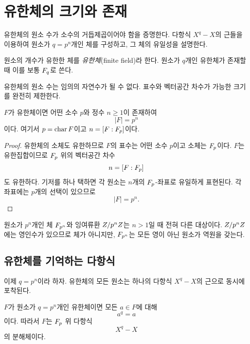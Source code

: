 \section{유한체의 크기와 존재}
\label{sec:finite-field-construction}

\begin{learninggoal}
유한체의 원소 수가 소수의 거듭제곱이어야 함을 증명한다. 다항식 $X^q-X$의 근들을 이용하여 원소가 $q=p^n$개인 체를 구성하고, 그 체의 유일성을 설명한다.
\end{learninggoal}

\begin{definition}[유한체]
원소의 개수가 유한한 체를 \emph{유한체}(finite field)라 한다. 원소가 $q$개인 유한체가 존재할 때 이를 보통 $F_q$로 쓴다.
\end{definition}

유한체의 원소 수는 임의의 자연수가 될 수 없다. 표수와 벡터공간 차수가 가능한 크기를 완전히 제한한다.

\begin{theorem}
$F$가 유한체이면 어떤 소수 $p$와 정수 $n\ge1$이 존재하여
\[
  |F|=p^n
\]
이다. 여기서 $p=\operatorname{char} F$이고 $n=[F:F_p]$이다.
\end{theorem}

\begin{proof}
유한체의 소체도 유한하므로 $F$의 표수는 어떤 소수 $p$이고 소체는 $F_p$이다. $F$는 유한집합이므로 $F_p$ 위의 벡터공간 차수
\[
  n=[F:F_p]
\]
도 유한하다. 기저를 하나 택하면 각 원소는 $n$개의 $F_p$-좌표로 유일하게 표현된다. 각 좌표에는 $p$개의 선택이 있으므로
\[
  |F|=p^n.
\]
\end{proof}

\begin{pitfall}
원소가 $p^n$개인 체 $F_{p^n}$와 잉여류환 $Z/p^nZ$는 $n>1$일 때 전혀 다른 대상이다. $Z/p^nZ$에는 영인수가 있으므로 체가 아니지만, $F_{p^n}$는 모든 영이 아닌 원소가 역원을 갖는다.
\end{pitfall}

\subsection{유한체를 기억하는 다항식}

이제 $q=p^n$이라 하자. 유한체의 모든 원소는 하나의 다항식 $X^q-X$의 근으로 동시에 포착된다.

\begin{proposition}
$F$가 원소가 $q=p^n$개인 유한체이면 모든 $a\in F$에 대해
\[
  a^q=a
\]
이다. 따라서 $F$는 $F_p$ 위 다항식
\[
  X^q-X
\]
의 분해체이다.
\end{proposition}


